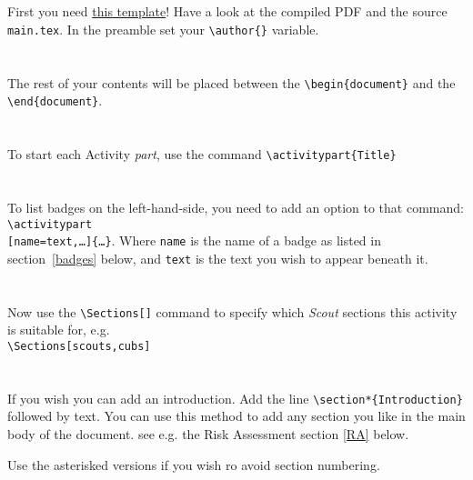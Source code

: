 \documentclass[a4paper]{GreyWolfsScoutActivityTemplate}
\begin{document}
\begin{ActivityProcedure}
\section{}
First you need \href{https://github.com/nimpo/GreyWolfsScoutsActivityTemplate}{this template}! Have a look at the compiled PDF and the source {\tt main.tex}. 
In the preamble set your {\tt \textbackslash{}author\{\}} variable. 
\section{}
The rest of your contents will be placed between the {\tt \textbackslash{}begin\{document\}} and the {\tt \textbackslash{}end\{document\}}.
\section{}
To start each Activity \textit{part}, use the command {\tt \small{\textbackslash{}activitypart\{Title\}}}
\section{}
To list badges on the left-hand-side, you need to add an option to that command:\\ {\tt \small{\textbackslash{}activitypart\\\hspace*{5mm}[name=text,\ldots]\{\ldots\}}}. Where {\tt name} is the name of a badge as listed in section~\ref{badges} below, and {\tt text} is the text you wish to appear beneath it.
\section{}
Now use the {\tt \textbackslash{}Sections[]} command to specify which \textit{\color{ScoutPurple} Scout} sections this activity is suitable for, e.g.\\{\tt \small{\textbackslash{}Sections[scouts,cubs]}}
\section{}
If you wish you can add an introduction. Add the line {\tt \textbackslash{}section*\{Introduction\}} followed by text. You can use this method to add any section you like in the main body of the document. see e.g. the Risk Assessment section \ref{RA} below.

Use the asterisked versions if you wish ro avoid section numbering.

\end{ActivityProcedure}
\end{document}
